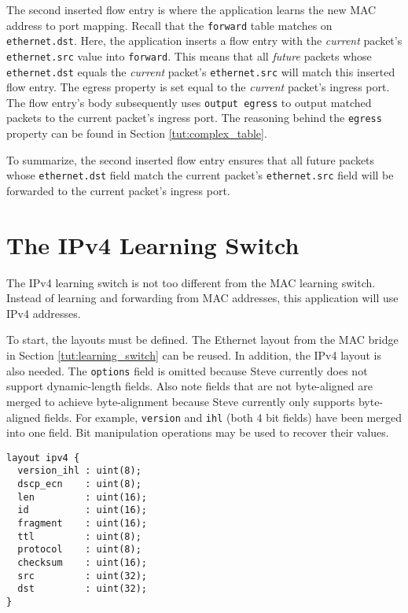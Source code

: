 The second inserted flow entry is where the application
learns the new MAC address to port mapping.
Recall that the \texttt{forward} table matches on \texttt{ethernet.dst}.
Here, the application inserts a flow entry with the \textit{current} packet's 
\texttt{ethernet.src} value into \texttt{forward}.
This means that all \textit{future} packets whose
\texttt{ethernet.dst} equals the \textit{current} packet's \texttt{ethernet.src}
will match this inserted flow entry. 
The egress property is set equal to the
\textit{current} packet's ingress port. The flow entry's body subsequently uses
\texttt{output egress} to output matched packets to the current packet's ingress port. The reasoning behind the \texttt{egress} property can be found in Section \ref{tut:complex_table}.

To summarize, the second inserted flow entry ensures that all future packets whose
\texttt{ethernet.dst} field match the current packet's \texttt{ethernet.src}
field will be forwarded to the current packet's ingress port. 


\section{The IPv4 Learning Switch} \label{tut:learning_router}

The IPv4 learning switch is not too different from the MAC learning switch. 
Instead of learning and forwarding from MAC addresses, this application will use 
IPv4 addresses.

To start, the layouts must be defined. The Ethernet layout
from the MAC bridge in Section \ref{tut:learning_switch} can be reused. 
In addition, the IPv4 layout is also needed. The \texttt{options} field is omitted because Steve currently does not support dynamic-length fields. Also note fields that are not byte-aligned are merged to achieve byte-alignment because Steve currently only supports byte-aligned fields. For example, \texttt{version} and \texttt{ihl} (both 4 bit fields) have been merged into one field. Bit manipulation operations may be used to recover their values.

\begin{lstlisting}
layout ipv4 {
  version_ihl : uint(8);
  dscp_ecn    : uint(8);
  len         : uint(16);
  id          : uint(16);
  fragment    : uint(16);
  ttl         : uint(8);
  protocol    : uint(8);
  checksum    : uint(16);
  src         : uint(32);
  dst         : uint(32);
}
\end{lstlisting}


